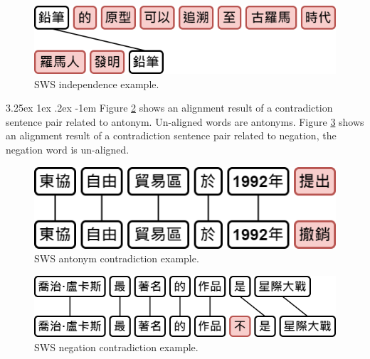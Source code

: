 \documentclass[12pt]{article}
\makeatletter
\renewcommand\paragraph{\@startsection{paragraph}{5}{\z@}%
  {3.25ex \@plus1ex \@minus.2ex}%
  {-1em}%
  {\normalfont\normalsize\bfseries}}
\makeatother
\begin{document}
\begin{CJK*}{UTF8}{bkai}
\begin{spacing}{1.77}
\hspace*{-1.5in}
\begin{figure}[H]
  \centering
  \includegraphics[scale=0.6]{SWS.I.png}
  \caption[SWS Independence Example]{SWS independence example.}
  \label{fig:sws_i}
\end{figure}

\paragraph{}
Figure \ref{fig:sws_c_antonym} shows an alignment result of a contradiction sentence pair related to antonym. Un-aligned words are antonyms. Figure \ref{fig:sws_c_neg} shows an alignment result of a contradiction sentence pair related to negation, the negation word is un-aligned.

\hspace*{-1.5in}
\begin{figure}[H]
  \centering
  \includegraphics[scale=0.6]{SWS.C.Antonym}
  \caption[SWS Antonym Contradiction Example]{SWS antonym contradiction example.}
  \label{fig:sws_c_antonym}
\end{figure}

\begin{figure}[H]
  \centering
  \includegraphics[scale=0.6]{SWS.C.Negation.png}
  \caption[SWS Negation Contradiction Example]{SWS negation contradiction example.}
  \label{fig:sws_c_neg}
\end{figure}


\end{spacing}
\end{CJK*}
\end{document}
